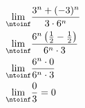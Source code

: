 
\begin{align}
    \lim_{\ntoinf} & \frac{3^n + (-3)^n}{3 \cdot 6^n} \\
    \lim_{\ntoinf} & \frac{6^n \left( \frac{1}{2} - \frac{1}{2} \right)}{6^n \cdot 3} \\
    \lim_{\ntoinf} & \frac{6^n \cdot 0}{6^n \cdot 3} \\
    \lim_{\ntoinf} & \frac{0}{3} = 0
\end{align}

\pagebreak
